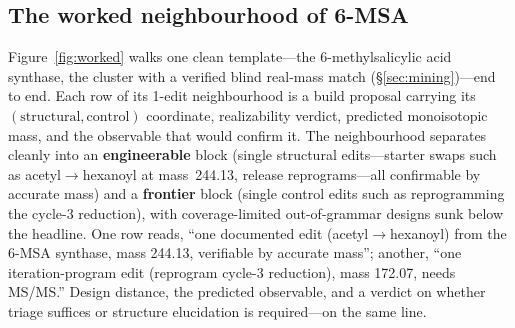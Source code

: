 \subsection{The worked neighbourhood of 6-MSA}\label{sec:worked}
Figure~\ref{fig:worked} walks one clean template---the 6-methylsalicylic acid synthase, the cluster with
a verified blind real-mass match (\S\ref{sec:mining})---end to end. Each row of its 1-edit neighbourhood
is a build proposal carrying its $(\text{structural},\text{control})$ coordinate, realizability verdict,
predicted monoisotopic mass, and the observable that would confirm it. The neighbourhood separates
cleanly into an \textbf{engineerable} block (single structural edits---starter swaps such as
acetyl$\to$hexanoyl at mass~244.13, release reprograms---all confirmable by accurate mass) and a
\textbf{frontier} block (single control edits such as reprogramming the cycle-3 reduction), with
coverage-limited out-of-grammar designs sunk below the headline. One row reads, ``one documented edit
(acetyl$\to$hexanoyl) from the 6-MSA synthase, mass 244.13, verifiable by accurate mass''; another, ``one
iteration-program edit (reprogram cycle-3 reduction), mass 172.07, needs MS/MS.'' Design distance, the
predicted observable, and a verdict on whether triage suffices or structure elucidation is required---on
the same line.

